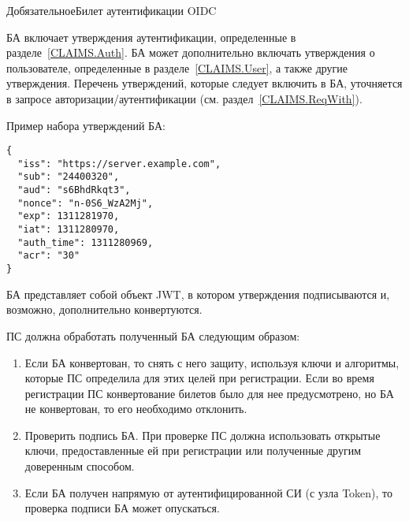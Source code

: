 \begin{appendix}{Д}{обязательное}{Билет аутентификации OIDC}\label{IDTOKEN}

\label{IDTOKEN.Structure}

БА включает утверждения аутентификации, определенные в разделе~\ref{CLAIMS.Auth}.
БА может дополнительно включать утверждения о пользователе, 
определенные в разделе~\ref{CLAIMS.User}, а также другие утверждения.
% 
Перечень утверждений, которые следует включить в БА, уточняется в 
запросе авторизации/аутентификации (см. раздел~\ref{CLAIMS.ReqWith}).

Пример набора утверждений БА:
\begin{lstlisting}
{
  "iss": "https://server.example.com",
  "sub": "24400320",
  "aud": "s6BhdRkqt3",
  "nonce": "n-0S6_WzA2Mj",
  "exp": 1311281970,
  "iat": 1311280970,
  "auth_time": 1311280969,
  "acr": "30"
}
\end{lstlisting}

БА представляет собой объект JWT, в котором утверждения подписываются и, 
возможно, дополнительно конвертуются.

%
%

\label{IDTOKEN.Process}

ПС должна обработать полученный БА следующим образом:

\begin{enumerate}
\item 
Если БА конвертован, то снять с него защиту, используя ключи и алгоритмы, 
которые ПС определила для этих целей при регистрации.
%
Если во время регистрации ПС конвертование билетов было для нее
предусмотрено, но БА не конвертован, то его необходимо отклонить.

\item 
Проверить подпись БА. При проверке ПС должна использовать открытые ключи, 
предоставленные ей при регистрации или полученные другим доверенным способом. 

\item 
Если БА получен напрямую от аутентифицированной СИ (с узла Token), 
то проверка подписи БА может опускаться.


\end{enumerate}
\end{appendix}
